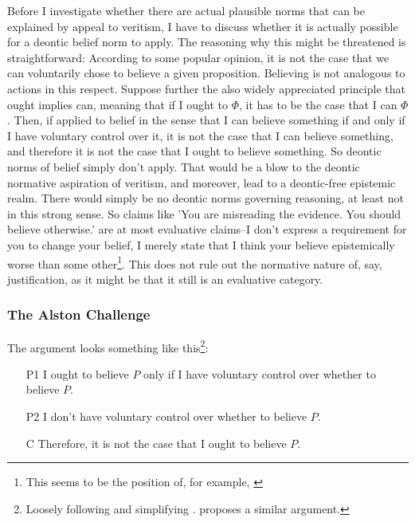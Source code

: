 \documentclass[12pt,numbers=noenddot]{scrartcl}
\begin{document}


Before I investigate whether there are actual plausible norms that can be explained by appeal to veritism, I have to discuss whether it is actually possible for a deontic belief norm to apply. The reasoning why this might be threatened is straightforward: According to some popular opinion, it is not the case that we can voluntarily chose to believe a given proposition. Believing is not analogous to actions in this respect. Suppose further the also widely appreciated principle that ought implies can, meaning that if I ought to $\Phi$, it has to be the case that I can $\Phi$. Then, if applied to belief in the sense that I can believe something if and only if I have voluntary control over it, it is not the case that I can believe something, and therefore it is not the case that I ought to believe something. So deontic norms of belief simply don't apply. That would be a blow to the deontic normative aspiration of veritism, and moreover, lead to a deontic-free epistemic realm. There would simply be no deontic norms governing reasoning, at least not in this strong sense. So claims like 'You are misreading the evidence. You should  believe otherwise.' are at most evaluative claims–I don't express a requirement for you to change your belief, I merely state that I think your believe epistemically worse than some other\footnote{This seems to be the position of, for example, \textcite[241]{grundmann2008}}. This does not rule out the normative nature of, say, justification, as it might be that it still is an evaluative category. 

\subsubsection{The Alston Challenge}

The argument looks something like this\footnote{Loosely following and simplifying \textcite{Alston1988-ALSTDC}. \textcite{Feldman2000-FELTEO-2} proposes a similar argument.}:

\begin{enumerate}
    \item[P1] I ought to believe $P$ only if I have voluntary control over whether to believe $P$.
    \item[P2] I don't have voluntary control over whether to believe $P$.
    \item[C] Therefore, it is not the case that I ought to believe $P$.
\end{enumerate}
\end{document}
